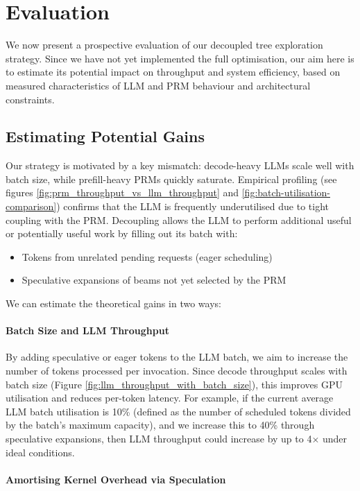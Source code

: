 \documentclass[11pt,twoside]{report}
\begin{document}
\section{Evaluation}

We now present a prospective evaluation of our decoupled tree exploration strategy. 
Since we have not yet implemented the full optimisation, our aim here is to estimate its potential impact on throughput and system efficiency, based on measured characteristics of LLM and PRM behaviour and architectural constraints.

\subsection{Estimating Potential Gains}

Our strategy is motivated by a key mismatch: decode-heavy LLMs scale well with batch size, while prefill-heavy PRMs quickly saturate. 
Empirical profiling (see figures \ref{fig:prm_throughput_vs_llm_throughput} and \ref{fig:batch-utilisation-comparison}) confirms that the LLM is frequently underutilised due to tight coupling with the PRM. 
Decoupling allows the LLM to perform additional useful or potentially useful work by filling out its batch with:
\begin{itemize}
  \item Tokens from unrelated pending requests (eager scheduling)
  \item Speculative expansions of beams not yet selected by the PRM
\end{itemize}

We can estimate the theoretical gains in two ways:

\paragraph{Batch Size and LLM Throughput}

By adding speculative or eager tokens to the LLM batch, we aim to increase the number of tokens processed per invocation. 
Since decode throughput scales with batch size (Figure \ref{fig:llm_throughput_with_batch_size}), this improves GPU utilisation and reduces per-token latency. 
For example, if the current average LLM batch utilisation is 10\% (defined as the number of scheduled tokens divided by the batch’s maximum capacity), and we increase this to 40\% through speculative expansions, then LLM throughput could increase by up to 4$\times$ under ideal conditions.

\paragraph{Amortising Kernel Overhead via Speculation}
\end{document}
